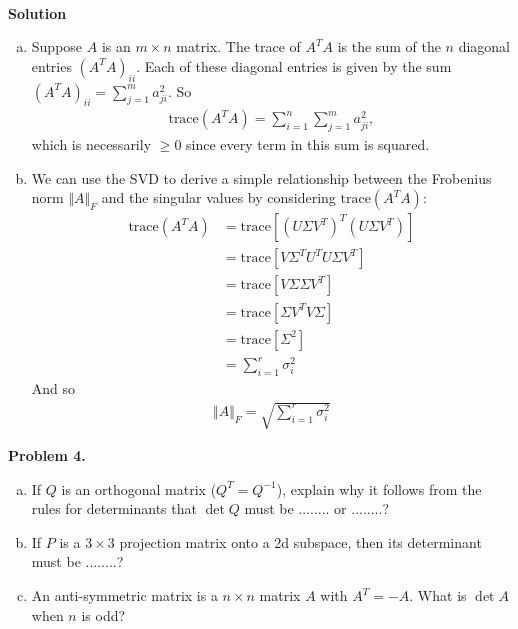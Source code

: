 \documentclass[11pt]{article}
\begin{document}
\

\noindent \textbf{Solution}\\
\begin{enumerate}[(a)]
\item Suppose $A$ is an $m\times n$ matrix. The trace of $A^TA$ is the sum of the $n$ diagonal entries $(A^TA)_{ii}$. Each of these diagonal entries is given by the sum $(A^TA)_{ii} = \sum_{j=1}^m a_{ji}^2$. So
\begin{align}
\boxed{\mbox{trace}(A^T A) = \sum_{i=1}^n\sum_{j=1}^m a_{ji}^2},
\end{align}
which is necessarily $\ge 0$ since every term in this sum is squared. 
\item We can use the SVD to derive a simple relationship between the Frobenius norm $\Vert A \Vert_F$ and the singular values by considering $\mbox{trace}(A^TA)$:
\begin{align}
\mbox{trace}(A^TA) &= \mbox{trace}\left[(U\Sigma V^T)^T(U\Sigma V^T)\right]\\
&= \mbox{trace}\left[V\Sigma^T U^T U\Sigma V^T\right]\\
&= \mbox{trace}\left[V\Sigma \Sigma V^T\right]\\
&= \mbox{trace}\left[\Sigma V^T V\Sigma \right]\\
&= \mbox{trace}\left[\Sigma^2\right]\\
&= \sum_{i=1}^r \sigma_i^2
\end{align}
And so
\begin{align}
\boxed{\Vert A \Vert_F = \sqrt{\sum_{i=1}^r \sigma_i^2}}
\end{align}
\end{enumerate}

\newpage

\noindent \textbf{Problem 4.}\\
\begin{enumerate}[(a)]
\item If $Q$ is an orthogonal matrix ($Q^T = Q^{-1}$), explain why it follows from the rules for determinants that $\det Q$ must be ........ or ........?
\item If $P$ is a $3\times 3$ projection matrix onto a 2d subspace, then its determinant must be ........?
\item An anti-symmetric matrix is a $n\times n$ matrix $A$ with $A^T=-A$. What is $\det A$ when $n$ is odd? 
\end{enumerate}

\
\end{document}
